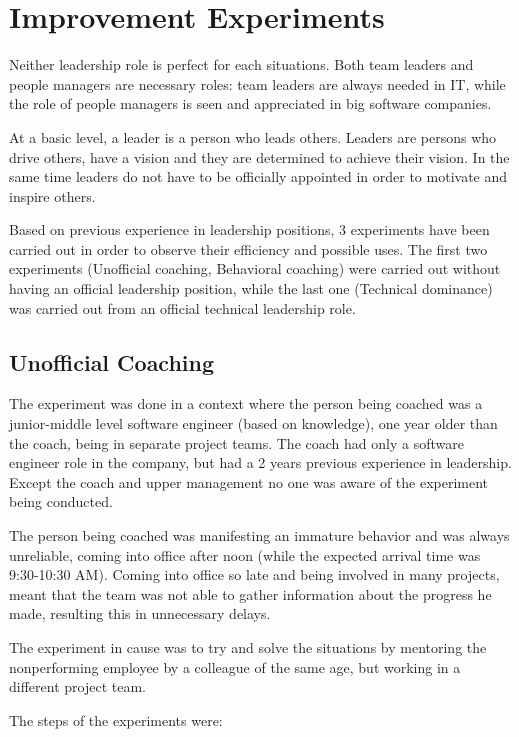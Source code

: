 \chapter{Improvement Experiments}
\label{chapter:improvement}
Neither leadership role is perfect for each situations. Both team leaders and people managers are necessary roles: team leaders are always needed in IT, while the role of people managers is seen and appreciated in big software companies.

At a basic level, a leader is a person who leads others. Leaders are persons who drive others, have a vision and they are determined to achieve their vision. In the same time leaders do not have to be officially appointed in order to motivate and inspire others.

Based on previous experience in leadership positions, 3 experiments have been carried out in order to observe their efficiency and possible uses. The first two experiments (Unofficial coaching, Behavioral coaching) were carried out without having an official leadership position, while the last one (Technical dominance) was carried out from an official technical leadership role.

\section{Unofficial Coaching}
\label{sec:un-coach}

The experiment was done in a context where the person being coached was a junior-middle level software engineer (based on knowledge), one year older than the coach, being in separate project teams. The coach had only a software engineer role in the company, but had a 2 years previous experience in leadership. Except the coach and upper management no one was aware of the experiment being conducted.

The person being coached was manifesting an immature behavior and was always unreliable, coming into office after noon (while the expected arrival time was 9:30-10:30 AM). Coming into office so late and being involved in many projects, meant that the team was not able to gather information about the progress he made, resulting this in unnecessary delays. 

The experiment in cause was to try and solve the situations by mentoring the nonperforming employee by a colleague of the same age, but working in a different project team.

The steps of the experiments were:

